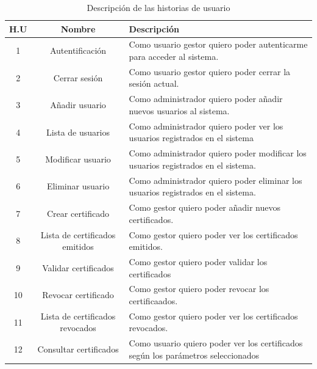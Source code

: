\begin{table}[!h]
	\begin{center}
		\begin{tabular}{|c|c|p{6cm}|}
		\hline \textbf{H.U} & \textbf{Nombre} & \textbf{Descripción}\\ 
		\hline 1 & Autentificación & Como usuario gestor quiero poder autenticarme para acceder al sistema. \\
		\hline 2 & Cerrar sesión & Como usuario gestor quiero poder cerrar la sesión actual. \\
		\hline 3 & Añadir usuario & Como administrador quiero poder añadir nuevos usuarios al sistema.\\
		\hline 4 & Lista de usuarios & Como administrador quiero poder ver los usuarios registrados en el sistema\\
		\hline 5 & Modificar usuario & Como administrador quiero poder modificar los usuarios registrados en el sistema.\\
		\hline 6 & Eliminar usuario & Como administrador quiero poder eliminar los usuarios registrados en el sistema.\\
		\hline 7 & Crear certificado & Como gestor quiero poder añadir nuevos certificados.\\
		\hline 8 & Lista de certificados emitidos & Como gestor quiero poder ver los certificados emitidos.\\
		\hline 9 & Validar certificados & Como gestor quiero poder validar los certificados\\
		\hline 10& Revocar certificado & Como gestor quiero poder revocar los certificaados.\\
		\hline 11& Lista de certificados revocados & Como gestor quiero poder ver los certificados revocados.\\
		\hline 12& Consultar certificados & Como usuario quiero poder ver los certificados según los parámetros seleccionados\\
		\hline 
		\end{tabular}
		\caption{Descripción de las historias de usuario}
		\label{tab:backlog}
	\end{center}
\end{table}


